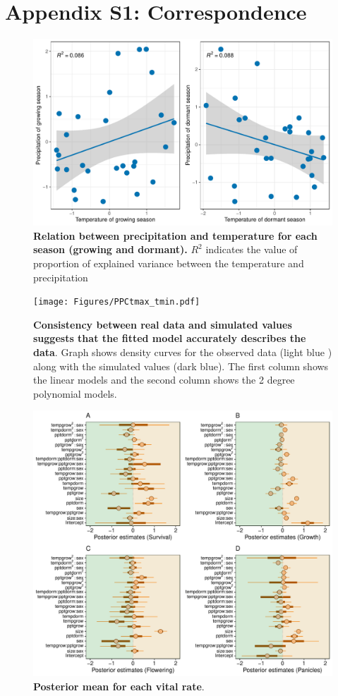 \documentclass[11pt]{article}\usepackage[]{graphicx}\usepackage[usenames,dvipsnames]{xcolor}
\begin{document}
\section*{Appendix S1: Correspondence }
\renewcommand{\thefigure}{A\arabic{figure}}\setcounter{figure}{0}
\renewcommand{\thetable}{A\arabic{table}}\setcounter{table}{0}
\renewcommand{\theequation}{A\arabic{equation}}\setcounter{equation}{0}
	\begin{figure}[H]
		\centering
		\includegraphics[width = \linewidth]{Figures/Varianceexplained.pdf}
		\caption{\textbf{Relation between precipitation and temperature for each season (growing and dormant).} $R^2$ indicates the value of proportion of explained variance between the temperature and precipitation}
	\end{figure}
	
  \begin{figure}[H]
		\centering
		\texttt{[image: Figures/PPCtmax\_tmin.pdf]}
		\caption{\textbf{Consistency between real data and simulated values suggests that the fitted model accurately describes the data}. Graph shows density curves for the observed data (light blue ) along with the simulated values (dark blue). The first column shows the linear models and the second column shows the 2 degree polynomial models.}
	\end{figure}
	
	
	 \begin{figure}%
		\centering
		\includegraphics[scale = 4.5]{Figures/Posterior_mean.pdf}
		\caption{\textbf{Posterior mean for each vital rate}. }
	\end{figure}
	



\end{document}
